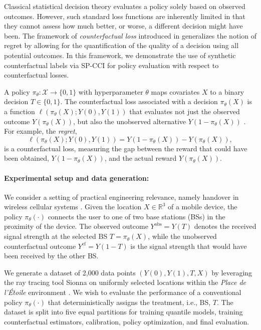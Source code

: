 \documentclass{article}
\theoremstyle{plain}
\theoremstyle{definition}
\theoremstyle{remark}
\begin{document}
Classical statistical decision theory evaluates a policy solely based on observed outcomes. However, such standard loss functions are inherently limited in that they cannot assess how much better, or worse, a different decision might have been. The framework of \textit{counterfactual loss} introduced in \citep{koch2025statistical} generalizes the notion of regret by allowing for the quantification of the quality of a decision using all potential outcomes. In this framework, we demonstrate the use of synthetic counterfactual labels via SP-CCI for policy evaluation with respect to counterfactual losses.

A policy \(\pi_\theta: \mathcal{X} \to \{0,1\}\) with hyperparameter $\theta$ maps covariates $X$ to a binary decision $T \in \{0,1\}$. The counterfactual loss associated with a decision \(\pi_\theta(X)\) is a function \(\ell(\pi_\theta(X); Y(0), Y(1))\) that evaluates not just the observed outcome \(Y(\pi_\theta(X))\), but also the unobserved alternative \(Y(1 - \pi_\theta(X))\) \citep{koch2025statistical}. For example, the \textit{regret},
\begin{equation}
\label{eq:regret_def}
    \ell(\pi_\theta(X); Y(0), Y(1)) = Y(1 - \pi_\theta(X)) - Y(\pi_\theta(X)),
\end{equation}
is a counterfactual loss, measuring the gap between the reward that could have been obtained, $Y(1 - \pi_\theta(X))$, and the actual reward $Y(\pi_\theta(X))$.

\paragraph{Experimental setup and data generation:} We consider a setting of practical engineering relevance, namely handover in wireless cellular systems \citep{khosravi2020learning}. Given the location \(X \in \mathbb{R}^3\) of a mobile device, the policy $\pi_\theta(\cdot)$ connects the user to one of two base stations (BSs) in the proximity of the device. The observed outcome \(Y^{\text{obs}} = Y(T)\) denotes the received signal strength at the selected BS $T = \pi_\theta(X)$, while the unobserved counterfactual outcome \(Y^{\text{cf}} = Y(1-T)\) is the signal strength that would have been received by the other BS.

We generate a dataset of 2,000 data points $(Y(0), Y(1), T, X)$ by leveraging the ray tracing tool Sionna \citep{hoydis2022sionna} on uniformly selected locations within the \textit{Place de l'\'Etoile} environment \citep{hoydis2022sionna}. We wish to evaluate the performance of a conventional policy $\pi_\theta(\cdot)$ that deterministically assigns the treatment, i.e., BS, $T$. The dataset is split into five equal partitions for training quantile models, training counterfactual estimators, calibration, policy optimization, and final evaluation.
\end{document}
